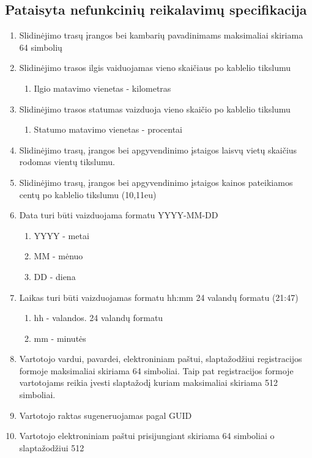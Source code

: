 \documentclass[oneside]{VUMIFPSkursinis}
\begin{document}
\subsection{Pataisyta nefunkcinių reikalavimų specifikacija}
\begin{enumerate}
	\item Slidinėjimo trasų įrangos bei kambarių pavadinimams maksimaliai skiriama 64 simbolių
	\item Slidinėjimo trasos ilgis vaiduojamas vieno skaičiaus po kablelio tikslumu
	\begin{enumerate}
		\item Ilgio matavimo vienetas - kilometras
	\end{enumerate}
	\item Slidinėjimo trasos statumas vaizduoja vieno skaičio po kablelio tikslumu
	\begin{enumerate}
		\item Statumo matavimo vienetas - procentai
	\end{enumerate}
	\item Slidinėjimo trasų, įrangos bei apgyvendinimo įstaigos laisvų vietų skaičius rodomas vientų tikslumu.
	\item Slidinėjimo trasų, įrangos bei apgyvendinimo įstaigos kainos pateikiamos centų po kablelio tikslumu (10,11eu)
	\item Data turi būti vaizduojama formatu YYYY-MM-DD
	\begin{enumerate}
		\item YYYY - metai
		\item MM - mėnuo
		\item DD - diena
	\end{enumerate}
	\item Laikas turi būti vaizduojamas formatu hh:mm 24 valandų formatu (21:47)
	\begin{enumerate}
		\item hh - valandos. 24 valandų formatu
		\item mm - minutės
	\end{enumerate}
	\item Vartotojo vardui, pavardei, elektroniniam paštui, slaptažodžiui registracijos formoje maksimaliai skiriama 64 simboliai. Taip pat registracijos formoje vartotojams reikia įvesti slaptažodį kuriam maksimaliai skiriama 512 simboliai.
	\item Vartotojo raktas sugeneruojamas pagal GUID
	\item Vartotojo elektroniniam paštui prisijungiant skiriama 64 simboliai o slaptažodžiui 512

\end{enumerate}
\end{document}
